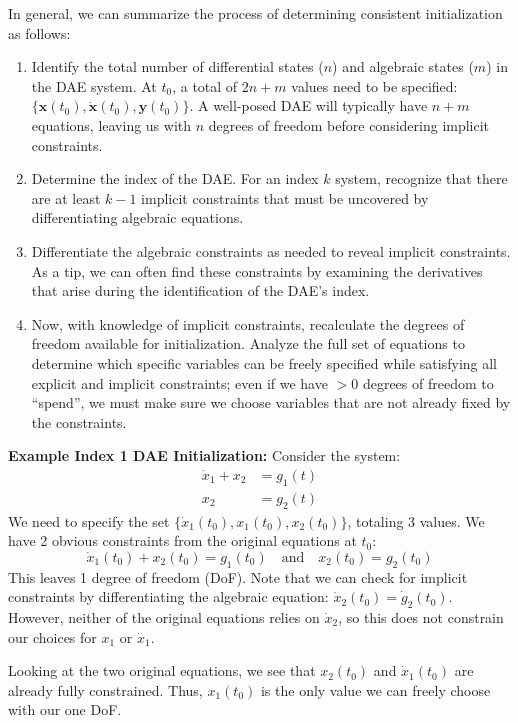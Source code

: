 In general, we can summarize the process of determining consistent initialization as follows:
\begin{enumerate}
    \item Identify the total number of differential states ($n$) and algebraic states ($m$) in the DAE system. At $t_0$, a total of $2n+m$ values need to be specified: $\{ \mathbf{x}(t_0), \dot{\mathbf{x}}(t_0), \mathbf{y}(t_0) \}$. A well-posed DAE will typically have $n+m$ equations, leaving us with $n$ degrees of freedom before considering implicit constraints.
    \item Determine the index of the DAE. For an index $k$ system, recognize that there are at least $k-1$ implicit constraints that must be uncovered by differentiating algebraic equations.
    \item Differentiate the algebraic constraints as needed to reveal implicit constraints. As a tip, we can often find these constraints by examining the derivatives that arise during the identification of the DAE's index.
    \item Now, with knowledge of implicit constraints, recalculate the degrees of freedom available for initialization. Analyze the full set of equations to determine which specific variables can be freely specified while satisfying all explicit and implicit constraints; even if we have $>0$ degrees of freedom to ``spend'', we must make sure we choose variables that are not already fixed by the constraints.
\end{enumerate}



\begin{exampleBox} \textbf{Example Index 1 DAE Initialization:} Consider the system:
\begin{equation}
    \begin{aligned}
        \dot{x}_1 + x_2 &= g_1(t) \\
        x_2 &= g_2(t)
    \end{aligned}
\end{equation}
We need to specify the set $\{\dot{x}_1(t_0), x_1(t_0), x_2(t_0)\}$, totaling 3 values. We have 2 obvious constraints from the original equations at $t_0$:
\begin{equation}
    \dot{x}_1(t_0) + x_2(t_0) = g_1(t_0) \quad \text{and} \quad x_2(t_0) = g_2(t_0)
\end{equation}
This leaves 1 degree of freedom (DoF).  Note that we can check for implicit constraints by differentiating the algebraic equation: $\dot{x}_2(t_0) = \dot{g}_2(t_0)$. However, neither of the original equations relies on $\dot{x}_2$, so this does not constrain our choices for $x_1$ or $\dot{x}_1$. 

Looking at the two original equations, we see that $x_2(t_0)$ and $\dot x_1(t_0)$ are already fully constrained. Thus, $x_1(t_0)$ is the only value we can freely choose with our one DoF.
\end{exampleBox}

